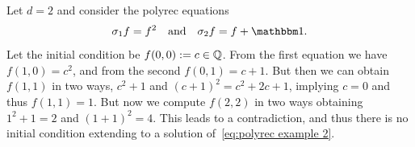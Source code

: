 
\begin{example}
    Let $d = 2$ and consider the polyrec equations
    \begin{align}
        \label{eq:polyrec example 2}
        \shift 1 f = f^2
            \quad\text{and}\quad
                \shift 2 f = f + \one.
    \end{align}
    Let the initial condition be $f(0, 0) := c \in \mathbb Q$.
    From the first equation we have $f(1, 0) = c^2$,
    and from the second $f(0, 1) = c+1$.
    But then we can obtain $f(1, 1)$ in two ways,
    $c^2 + 1$ and $(c+1)^2 = c^2 + 2c + 1$,
    implying $c = 0$ and thus $f(1, 1) = 1$.
    But now we compute $f(2, 2)$ in two ways
    obtaining $1^2 + 1 = 2$ and $(1+1)^2 = 4$.
    This leads to a contradiction,
    and thus there is no initial condition extending to a solution of~\cref{eq:polyrec example 2}.
\end{example}


